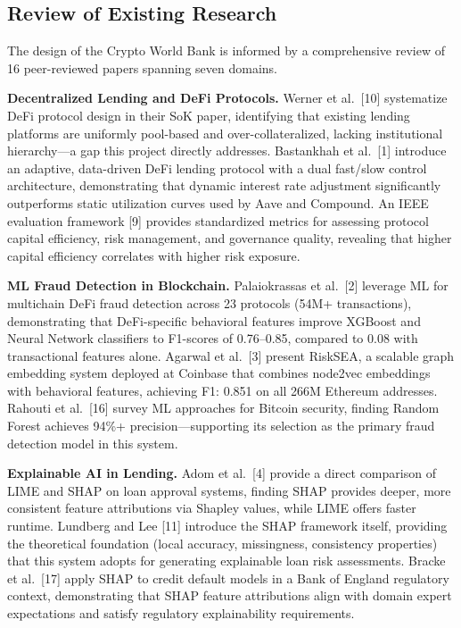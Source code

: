\documentclass[11pt,a4paper]{article}
\begin{document}
\begin{doublespacing}
\subsection{Review of Existing Research}

The design of the Crypto World Bank is informed by a comprehensive review of 16 peer-reviewed papers spanning seven domains.

\hangindent=0.5in \textbf{Decentralized Lending and DeFi Protocols.} Werner et al.~[10] systematize DeFi protocol design in their SoK paper, identifying that existing lending platforms are uniformly pool-based and over-collateralized, lacking institutional hierarchy—a gap this project directly addresses. Bastankhah et al.~[1] introduce an adaptive, data-driven DeFi lending protocol with a dual fast/slow control architecture, demonstrating that dynamic interest rate adjustment significantly outperforms static utilization curves used by Aave and Compound. An IEEE evaluation framework [9] provides standardized metrics for assessing protocol capital efficiency, risk management, and governance quality, revealing that higher capital efficiency correlates with higher risk exposure.

\hangindent=0.5in \textbf{ML Fraud Detection in Blockchain.} Palaiokrassas et al.~[2] leverage ML for multichain DeFi fraud detection across 23 protocols (54M+ transactions), demonstrating that DeFi-specific behavioral features improve XGBoost and Neural Network classifiers to F1-scores of 0.76--0.85, compared to 0.08 with transactional features alone. Agarwal et al.~[3] present RiskSEA, a scalable graph embedding system deployed at Coinbase that combines node2vec embeddings with behavioral features, achieving F1: 0.851 on all 266M Ethereum addresses. Rahouti et al.~[16] survey ML approaches for Bitcoin security, finding Random Forest achieves 94\%+ precision—supporting its selection as the primary fraud detection model in this system.

\hangindent=0.5in \textbf{Explainable AI in Lending.} Adom et al.~[4] provide a direct comparison of LIME and SHAP on loan approval systems, finding SHAP provides deeper, more consistent feature attributions via Shapley values, while LIME offers faster runtime. Lundberg and Lee [11] introduce the SHAP framework itself, providing the theoretical foundation (local accuracy, missingness, consistency properties) that this system adopts for generating explainable loan risk assessments. Bracke et al.~[17] apply SHAP to credit default models in a Bank of England regulatory context, demonstrating that SHAP feature attributions align with domain expert expectations and satisfy regulatory explainability requirements.


\end{doublespacing}
\end{document}
